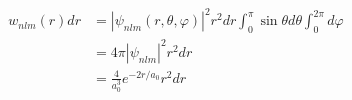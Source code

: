 \begin{frame}[label=current]
  \frametitle{}
  $$
  \begin{aligned}
    w_{n l m}(r) d r&= \left|\psi_{n l m}(r, \theta, \varphi)\right|^2 r^2 d r\int_0^\pi\sin \theta  d\theta \int_0^{2 \pi} d \varphi \\
    &=4 \pi\left|\psi_{n l m}\right|^2 r^2 d r \\ 
    &= \frac{4}{a_0^3} e^{-2 r / a_0} r^2 d r
  \end{aligned}
  $$
\end{frame} 



%


